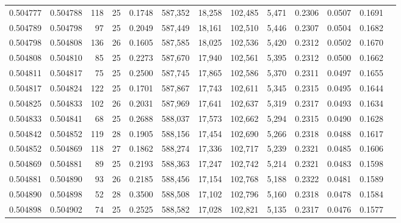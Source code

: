 \begin{tabular}{rrrrrrrrrrrrr}
0.504777 & 0.504788 & 118 &  25 &                                     0.1748 & 587,352 &  18,258 & 102,485 &   5,471 & 0.2306 & 0.0507 & 0.1691 \\
0.504789 & 0.504798 &  97 &  25 &                                     0.2049 & 587,449 &  18,161 & 102,510 &   5,446 & 0.2307 & 0.0504 & 0.1682 \\
0.504798 & 0.504808 & 136 &  26 &                                     0.1605 & 587,585 &  18,025 & 102,536 &   5,420 & 0.2312 & 0.0502 & 0.1670 \\
0.504808 & 0.504810 &  85 &  25 &                                     0.2273 & 587,670 &  17,940 & 102,561 &   5,395 & 0.2312 & 0.0500 & 0.1662 \\
0.504811 & 0.504817 &  75 &  25 &                                     0.2500 & 587,745 &  17,865 & 102,586 &   5,370 & 0.2311 & 0.0497 & 0.1655 \\
0.504817 & 0.504824 & 122 &  25 &                                     0.1701 & 587,867 &  17,743 & 102,611 &   5,345 & 0.2315 & 0.0495 & 0.1644 \\
0.504825 & 0.504833 & 102 &  26 &                                     0.2031 & 587,969 &  17,641 & 102,637 &   5,319 & 0.2317 & 0.0493 & 0.1634 \\
0.504833 & 0.504841 &  68 &  25 &                                     0.2688 & 588,037 &  17,573 & 102,662 &   5,294 & 0.2315 & 0.0490 & 0.1628 \\
0.504842 & 0.504852 & 119 &  28 &                                     0.1905 & 588,156 &  17,454 & 102,690 &   5,266 & 0.2318 & 0.0488 & 0.1617 \\
0.504852 & 0.504869 & 118 &  27 &                                     0.1862 & 588,274 &  17,336 & 102,717 &   5,239 & 0.2321 & 0.0485 & 0.1606 \\
0.504869 & 0.504881 &  89 &  25 &                                     0.2193 & 588,363 &  17,247 & 102,742 &   5,214 & 0.2321 & 0.0483 & 0.1598 \\
0.504881 & 0.504890 &  93 &  26 &                                     0.2185 & 588,456 &  17,154 & 102,768 &   5,188 & 0.2322 & 0.0481 & 0.1589 \\
0.504890 & 0.504898 &  52 &  28 &                                     0.3500 & 588,508 &  17,102 & 102,796 &   5,160 & 0.2318 & 0.0478 & 0.1584 \\
0.504898 & 0.504902 &  74 &  25 &                                     0.2525 & 588,582 &  17,028 & 102,821 &   5,135 & 0.2317 & 0.0476 & 0.1577 \\

\end{tabular}
